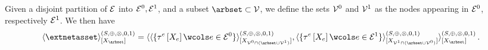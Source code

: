 \documentclass[aps,onecolumn,nofootinbib,pra]{article}
\newcommand{\gensemiring}{(S,\srplus,\srmul,0,1)}
\newcommand{\srcontractionofwrt}[3]{\langle#1\rangle^{#3}_{[#2]}}
\newcommand{\srplus}{\oplus}
\newcommand{\srmul}{\otimes} %
\begin{document}
    \begin{theorem}
        Given a disjoint partition of $\mathcal{E}$ into $\mathcal{E}^{0},\mathcal{E}^{1}$, and a subset $\arbset\subset\nodes$, we define the sets $\mathcal{V}^{0}$ and $\mathcal{V}^{1}$ as the nodes appearing in $\mathcal{E}^{0}$, respectively $\mathcal{E}^{1}$.
        We then have
        \begin{align*}
            \srcontractionofwrt{
                \extnetasset
            }{\catvariableof{\arbset}}{\gensemiring}
            =
            \srcontractionofwrt{
                \srcontractionofwrt{
                    \{\hypercoreofat{\edge}{\catvariableof{\edge}} \wcols \edge\in\edgesof{0}\}
                }{\catvariableof{\nodesof{0}\cap(\arbset\cup\nodesof{1})}}{\gensemiring},
                \srcontractionofwrt{
                    \{\hypercoreofat{\edge}{\catvariableof{\edge}} \wcols \edge\in\edgesof{1}\}
                }{\catvariableof{\nodesof{1}\cap(\arbset\cup\nodesof{0})}}{\gensemiring}
            }{\catvariableof{\arbset}}{\gensemiring} \, .
        \end{align*}
    \end{theorem}
\end{document}
